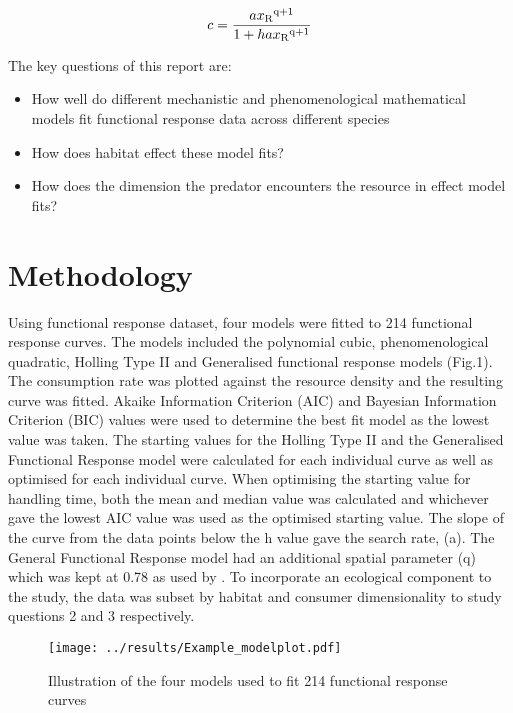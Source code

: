 \documentclass[11pt]{article}
\begin{document}
$$c=\frac{ax\textsubscript{R}\textsuperscript{q+1}}{1 + hax\textsubscript{R}\textsuperscript{q+1}}$$

The key questions of this report are:
	\begin{itemize}
	\item How well do different mechanistic and phenomenological mathematical models fit functional response data across different species
	\item How does habitat effect these model fits? 
	\item How does the dimension the predator encounters the resource in effect model fits? 
	\end{itemize}
\newpage

	\section*{Methodology}
\noindent

Using \cite{Pawar2012} functional response dataset, four models were fitted to 214 functional response curves. The models included the polynomial cubic, phenomenological quadratic, Holling Type II and Generalised functional response models (Fig.1). The consumption rate was plotted against the resource density and the resulting curve was fitted. Akaike Information Criterion (AIC) and Bayesian Information Criterion (BIC) values were used to determine the best fit model as the lowest value was taken.
The starting values for the Holling Type II and the Generalised Functional Response model were calculated for each individual curve as well as optimised for each individual curve. When optimising the starting value for handling time, both the mean and median value was calculated and whichever gave the lowest AIC value was used as the optimised starting value. The slope of the curve from the data points below the h value gave the search rate, (a). The General Functional Response model had an additional spatial parameter (q) which was kept at 0.78 as used by \cite{Pawar2012}. To incorporate an ecological component to the study, the data was subset by habitat and consumer dimensionality to study questions 2 and 3 respectively. \newline

\begin{figure}[h!]
	\centering 
	\texttt{[image: ../results/Example\_modelplot.pdf]}
	\caption{Illustration of the four models used to fit 214 functional response curves}
	\label{Four models plotted}
\end{figure}
\end{document}
